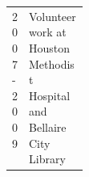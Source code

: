 \documentclass[10pt,letterpaper]{res}
\begin{document}
\begin{resume}
\begin{longtable}{@{}>{\raggedright}p{0.11\linewidth}
				p{}@{}}
			{2007 - 2009} & Volunteer work at Houston Methodist Hospital and Bellaire City Library\\
			
		\end{longtable}
	\end{resume} 
\end{document}
